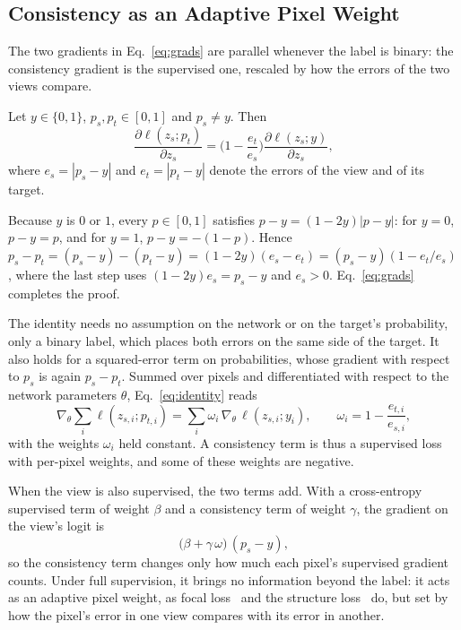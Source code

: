 \subsection{Consistency as an Adaptive Pixel Weight}
\label{sec:identity}

The two gradients in Eq.~\eqref{eq:grads} are parallel whenever the label is binary: the consistency
gradient is the supervised one, rescaled by how the errors of the two views compare.

\begin{proposition}
\label{prop:identity}
Let $y\in\{0,1\}$, $p_s,p_t\in[0,1]$ and $p_s\neq y$. Then
\begin{equation}
\frac{\partial\ell(z_s;p_t)}{\partial z_s}=\Big(1-\frac{e_t}{e_s}\Big)\frac{\partial\ell(z_s;y)}{\partial z_s},
\label{eq:identity}
\end{equation}
where $e_s=|p_s-y|$ and $e_t=|p_t-y|$ denote the errors of the view and of its target.
\end{proposition}

\begin{IEEEproof}
Because $y$ is $0$ or $1$, every $p\in[0,1]$ satisfies $p-y=(1-2y)|p-y|$: for $y=0$, $p-y=p$, and for
$y=1$, $p-y=-(1-p)$. Hence $p_s-p_t=(p_s-y)-(p_t-y)=(1-2y)(e_s-e_t)=(p_s-y)(1-e_t/e_s)$, where the last
step uses $(1-2y)e_s=p_s-y$ and $e_s>0$. Eq.~\eqref{eq:grads} completes the proof.
\end{IEEEproof}

The identity needs no assumption on the network or on the target's probability, only a binary
label, which places both errors on the same side of the target. It also holds for a squared-error
term on probabilities, whose gradient with respect to $p_s$ is again $p_s-p_t$. Summed over pixels
and differentiated with respect to the network parameters $\theta$, Eq.~\eqref{eq:identity} reads
\begin{equation}
\nabla_\theta\sum_i \ell(z_{s,i};p_{t,i})=\sum_i \omega_i\,\nabla_\theta\,\ell(z_{s,i};y_i),
\qquad \omega_i=1-\frac{e_{t,i}}{e_{s,i}},
\label{eq:weights}
\end{equation}
with the weights $\omega_i$ held constant. A consistency term is thus a supervised loss with
per-pixel weights, and some of these weights are negative.

When the view is also supervised, the two terms add. With a cross-entropy supervised term of weight
$\beta$ and a consistency term of weight $\gamma$, the gradient on the view's logit is
\begin{equation}
\big(\beta+\gamma\,\omega\big)\,(p_s-y),
\label{eq:combined}
\end{equation}
so the consistency term changes only how much each pixel's supervised gradient counts. Under full
supervision, it brings no information beyond the label: it acts as an adaptive pixel weight, as
focal loss~\cite{lin2017focal} and the structure loss~\cite{wei2020f3net} do, but set by how the
pixel's error in one view compares with its error in another.


